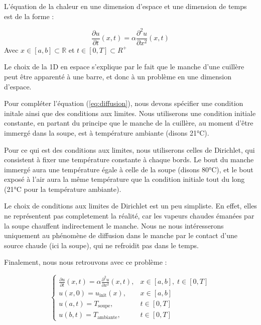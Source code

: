 \documentclass[11pt,a4paper]{article}
\begin{document}
L'équation de la chaleur en une dimension d'espace et une dimension de temps est de la forme :

\begin{equation}
  \frac{\partial u}{\partial t} (x,t) = \alpha \frac{\partial^2 u}{\partial x^2} (x,t)
  \label{eq:diffusion}
\end{equation}
Avec $ x \in [a,b] \subset \mathbb{R} $ et $ t \in [0,T] \subset R^+ $

Le choix de la 1D en espace s'explique par le fait que le manche d'une cuillère peut être apparenté à une barre,
et donc à un problème en une dimension d'espace.

Pour compléter l'équation (\ref{eq:diffusion}), nous devons spécifier une condition initale ainsi que des conditions aux limites.
Nous utiliserons une condition initiale constante, en partant du principe que le manche de la cuillère, 
au moment d'être immergé dans la soupe, est à température ambiante (disons 21°C).

Pour ce qui est des conditions aux limites, nous utiliserons celles de Dirichlet, qui consistent à fixer une température
constante à chaque bords. 
Le bout du manche immergé aura une température égale à celle de la soupe (disons 80°C), 
et le bout exposé à l'air aura la même température que la condition initiale tout du long (21°C pour la température ambiante).

Le choix de conditions aux limites de Dirichlet est un peu simpliste.
En effet, elles ne représentent pas completement la réalité, car les vapeurs chaudes émanées par la soupe chauffent indirectement le manche.
Nous ne nous intéresserons uniquement au phénomène de diffusion dans le manche par le contact d'une source chaude (ici la soupe), qui 
ne refroidit pas dans le temps.

Finalement, nous nous retrouvons avec ce problème :

\begin{equation}
\label{eq:chaleur-generale}
\begin{cases}
  \frac{\partial u}{\partial t} (x,t) = \alpha \frac{\partial^2 u}{\partial x^2} (x,t), & x \in [a,b],\; t \in [0,T] \\
  u(x,0) = u_{\text{init}}(x), & x \in [a,b] \\
  u(a,t) = T_{\text{soupe}}, & t \in [0,T] \\
  u(b,t) = T_{\text{ambiante}}, & t \in [0,T]
\end{cases}
\end{equation}
\end{document}
